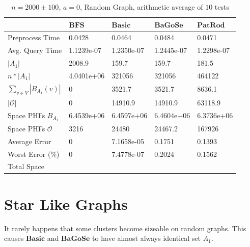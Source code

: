 \documentclass[shortabstract, lic, english]{iithesis}
\theoremstyle{definition} \newtheorem{definition}{Definition}[chapter]
\theoremstyle{remark} \newtheorem{remark}[definition]{Observation}
\theoremstyle{plain} \newtheorem{theorem}[definition]{Theorem}
\theoremstyle{plain} \newtheorem{lemma}[definition]{Lemma}
\theoremstyle{plain} \newtheorem{conjecture}[definition]{Conjecture}
\begin{document}
\begin{table}[H] \label{test:random.a0}
    \centering
    \begin{tabular}{ |p{3cm}||p{2cm}|p{2cm}|p{2cm}|p{2cm}|  } 
        \hline
        & $\mathbf{BFS}$ & $\mathbf{Basic}$ & $\mathbf{BaGoSe}$ & $\mathbf{PatRod}$ \\
        \hline
        \hline
        Preprocess Time                 & 0.0428     & 0.0464     & 0.0484      & 0.0471     \\
        \hline
        Avg. Query Time                 & 1.1239e-07 & 1.2350e-07 & 1.2445e-07  & 1.2298e-07 \\
        \hline
        $|A_1|$                         & 2008.9     & 159.7      & 159.7       & 181.5      \\
        \hline
        $n * |A_1|$                     & 4.0401e+06 & 321056     & 321056      & 464122     \\
        \hline
        $\sum_{v \in V} |B_{A_1}(v)| $  & 0          & 3521.7     & 3521.7      & 8636.1     \\
        \hline
        $|\mathcal{O}|$                 & 0          & 14910.9    & 14910.9     & 63118.9    \\
        \hline
        Space PHFs $B_{A_1}$            & 6.4539e+06 & 6.4597e+06 & 6.4604e+06  & 6.3736e+06 \\
        \hline
        Space PHFs $\mathcal{O}$        & 3216       & 24480      & 24467.2     & 167926     \\
        \hline
        Average Error                   & 0          & 7.1658e-05 & 0.1751      & 0.1393     \\
        \hline
        Worst Error (\%)                & 0          & 7.4778e-07 & 0.2024      & 0.1562     \\
        \hline
        Total Space                     &            &            &             &            \\
        \hline

    \end{tabular}
    \caption{$n = 2000 \pm 100$, $a = 0$, Random Graph, arithmetic average of $10$ tests}
\end{table}


\section{Star Like Graphs}

It rarely happens that some clusters become sizeable on random graphs.
This causes $\mathbf{Basic}$ and $\mathbf{BaGoSe}$ to have almost always identical set $A_1$.
\end{document}
